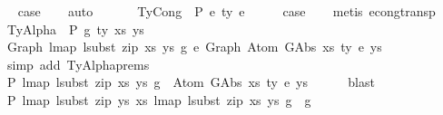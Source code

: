 \begin{isabellebody}
\ \isamarkupfalse%
\ {\isacharquery}{\kern0pt}case\isanewline
\ \ \isamarkupfalse%
\ auto\isanewline
\ \ \isamarkupfalse%
\isanewline
{}\isamarkupfalse%
\isanewline
\ \ \isamarkupfalse%
\ {\isacharparenleft}{\kern0pt}TyCong\ {\isasymGamma}\ P\ e{}\ ty\ e{}{\isacharparenright}{\kern0pt}\isanewline
\ \ \isamarkupfalse%
\ \isamarkupfalse%
\ {\isacharquery}{\kern0pt}case\isanewline
\ \ \isamarkupfalse%
\ {\isacharparenleft}{\kern0pt}metis\ econg{\isacharunderscore}{\kern0pt}transp{\isacharparenright}{\kern0pt}\isanewline
{}\isamarkupfalse%
\isanewline
\ \ \isamarkupfalse%
\ {\isacharparenleft}{\kern0pt}TyAlpha\ {\isasymGamma}{}\ P\ g\ ty\ xs{\isacharprime}{\kern0pt}\ ys{\isacharprime}{\kern0pt}{\isacharparenright}{\kern0pt}\isanewline
\ \ \isamarkupfalse%
\ {\isachardoublequoteopen}Graph\ {\isacharparenleft}{\kern0pt}lmap\ {\isacharparenleft}{\kern0pt}lsubst\ {\isacharparenleft}{\kern0pt}zip\ xs{\isacharprime}{\kern0pt}\ ys{\isacharprime}{\kern0pt}{\isacharparenright}{\kern0pt}{\isacharparenright}{\kern0pt}\ g{\isacharparenright}{\kern0pt}\ {\isasymsimeq}e\ Graph\ {\isacharparenleft}{\kern0pt}Atom\ {\isacharparenleft}{\kern0pt}GAbs\ xs\ ty{}{\isacharprime}{\kern0pt}\ e{\isacharprime}{\kern0pt}{\isacharparenright}{\kern0pt}\ ys{\isacharparenright}{\kern0pt}{\isachardoublequoteclose}\isanewline
\ \ \ \ \isamarkupfalse%
\ {\isacharparenleft}{\kern0pt}simp\ add{\isacharcolon}{\kern0pt}\ TyAlpha{\isachardot}{\kern0pt}prems{\isacharparenleft}{\kern0pt}{}{\isacharparenright}{\kern0pt}{\isacharparenright}{\kern0pt}\isanewline
\ \ \isamarkupfalse%
\ \isamarkupfalse%
\ P{}{\isacharcolon}{\kern0pt}\ {\isachardoublequoteopen}lmap\ {\isacharparenleft}{\kern0pt}lsubst\ {\isacharparenleft}{\kern0pt}zip\ xs{\isacharprime}{\kern0pt}\ ys{\isacharprime}{\kern0pt}{\isacharparenright}{\kern0pt}{\isacharparenright}{\kern0pt}\ g\ {\isasymsimeq}\ Atom\ {\isacharparenleft}{\kern0pt}GAbs\ xs\ ty{}{\isacharprime}{\kern0pt}\ e{\isacharprime}{\kern0pt}{\isacharparenright}{\kern0pt}\ ys{\isachardoublequoteclose}\isanewline
\ \ \ \ \isamarkupfalse%
\ blast\isanewline
\isanewline
\ \ \isamarkupfalse%
\ P{}{\isacharcolon}{\kern0pt}\ {\isachardoublequoteopen}lmap\ {\isacharparenleft}{\kern0pt}lsubst\ {\isacharparenleft}{\kern0pt}zip\ ys{\isacharprime}{\kern0pt}\ xs{\isacharprime}{\kern0pt}{\isacharparenright}{\kern0pt}{\isacharparenright}{\kern0pt}\ {\isacharparenleft}{\kern0pt}lmap\ {\isacharparenleft}{\kern0pt}lsubst\ {\isacharparenleft}{\kern0pt}zip\ xs{\isacharprime}{\kern0pt}\ ys{\isacharprime}{\kern0pt}{\isacharparenright}{\kern0pt}{\isacharparenright}{\kern0pt}\ g{\isacharparenright}{\kern0pt}\ {\isacharequal}{\kern0pt}\ g{\isachardoublequoteclose}\isanewline

\end{isabellebody}
